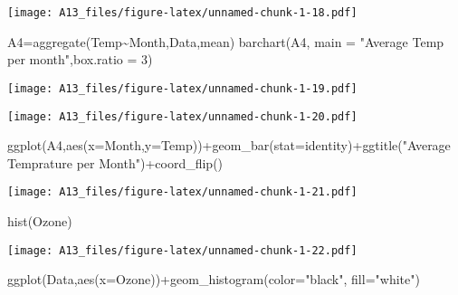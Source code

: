 \documentclass[
]{article}
\newenvironment{Shaded}{\begin{snugshade}}{\end{snugshade}}
\newcommand{\AttributeTok}[1]{\textcolor[rgb]{0.77,0.63,0.00}{#1}}
\newcommand{\DecValTok}[1]{\textcolor[rgb]{0.00,0.00,0.81}{#1}}
\newcommand{\FunctionTok}[1]{\textcolor[rgb]{0.00,0.00,0.00}{#1}}
\newcommand{\NormalTok}[1]{#1}
\newcommand{\OtherTok}[1]{\textcolor[rgb]{0.56,0.35,0.01}{#1}}
\newcommand{\SpecialCharTok}[1]{\textcolor[rgb]{0.00,0.00,0.00}{#1}}
\newcommand{\StringTok}[1]{\textcolor[rgb]{0.31,0.60,0.02}{#1}}
\begin{document}
\texttt{[image: A13\_files/figure-latex/unnamed-chunk-1-18.pdf]}

\begin{Shaded}
\begin{Highlighting}[]
\NormalTok{A4}\OtherTok{=}\FunctionTok{aggregate}\NormalTok{(Temp}\SpecialCharTok{\textasciitilde{}}\NormalTok{Month,Data,mean)}
\FunctionTok{barchart}\NormalTok{(A4, }\AttributeTok{main =} \StringTok{"Average Temp per month"}\NormalTok{,}\AttributeTok{box.ratio =} \DecValTok{3}\NormalTok{)}
\end{Highlighting}
\end{Shaded}

\texttt{[image: A13\_files/figure-latex/unnamed-chunk-1-19.pdf]}

\begin{Shaded}
\end{Shaded}

\texttt{[image: A13\_files/figure-latex/unnamed-chunk-1-20.pdf]}

\begin{Shaded}
\begin{Highlighting}[]
\FunctionTok{ggplot}\NormalTok{(A4,}\FunctionTok{aes}\NormalTok{(}\AttributeTok{x=}\NormalTok{Month,}\AttributeTok{y=}\NormalTok{Temp))}\SpecialCharTok{+}\FunctionTok{geom\_bar}\NormalTok{(}\AttributeTok{stat=}\StringTok{\textquotesingle{}identity\textquotesingle{}}\NormalTok{)}\SpecialCharTok{+}\FunctionTok{ggtitle}\NormalTok{(}\StringTok{"Average Temprature per Month"}\NormalTok{)}\SpecialCharTok{+}\FunctionTok{coord\_flip}\NormalTok{()}
\end{Highlighting}
\end{Shaded}

\texttt{[image: A13\_files/figure-latex/unnamed-chunk-1-21.pdf]}

\begin{Shaded}
\begin{Highlighting}[]
\FunctionTok{hist}\NormalTok{(Ozone)}
\end{Highlighting}
\end{Shaded}

\texttt{[image: A13\_files/figure-latex/unnamed-chunk-1-22.pdf]}

\begin{Shaded}
\begin{Highlighting}[]
\FunctionTok{ggplot}\NormalTok{(Data,}\FunctionTok{aes}\NormalTok{(}\AttributeTok{x=}\NormalTok{Ozone))}\SpecialCharTok{+}\FunctionTok{geom\_histogram}\NormalTok{(}\AttributeTok{color=}\StringTok{"black"}\NormalTok{, }\AttributeTok{fill=}\StringTok{"white"}\NormalTok{)}
\end{Highlighting}
\end{Shaded}
\end{document}
